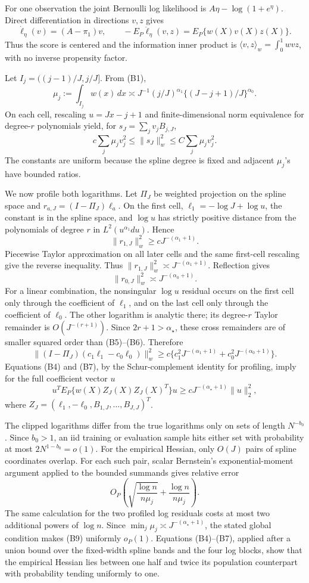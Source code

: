 For one observation the joint Bernoulli log likelihood is \(A\eta-\log(1+e^\eta)\).  Direct differentiation in directions \(v,z\) gives
\[
 \dot\ell_\eta(v)=(A-\pi_1)v,
 \qquad
 -E_P\ddot\ell_\eta(v,z)=E_P\{w(X)v(X)z(X)\}.
\tag{B2}
\]
Thus the score is centered and the information inner product is \(\langle v,z\rangle_w=\int_0^1wvz\), with no inverse propensity factor.

Let \(I_j=((j-1)/J,j/J]\).  From (B1),
\[
 \mu_j:=\int_{I_j}w(x)\,dx
 \asymp J^{-1}(j/J)^{\alpha_1}\{(J-j+1)/J\}^{\alpha_0}.
\tag{B3}
\]
On each cell, rescaling \(u=Jx-j+1\) and finite-dimensional norm equivalence for degree-\(r\) polynomials yield, for \(s_J=\sum_jv_jB_{j,J}\),
\[
 c\sum_j\mu_jv_j^2\le\|s_J\|_w^2\le C\sum_j\mu_jv_j^2.
\tag{B4}
\]
The constants are uniform because the spline degree is fixed and adjacent \(\mu_j\)'s have bounded ratios.

We now profile both logarithms.  Let \(\Pi_J\) be weighted projection on the spline space and \(r_{a,J}=(I-\Pi_J)\ell_a\).  On the first cell, \(\ell_1=-\log J+\log u\), the constant is in the spline space, and \(\log u\) has strictly positive distance from the polynomials of degree \(r\) in \(L^2(u^{\alpha_1}du)\).  Hence
\[
 \|r_{1,J}\|_w^2\ge cJ^{-(\alpha_1+1)}.
\tag{B5}
\]
Piecewise Taylor approximation on all later cells and the same first-cell rescaling give the reverse inequality.  Thus \(\|r_{1,J}\|_w^2\asymp J^{-(\alpha_1+1)}\).  Reflection gives
\[
 \|r_{0,J}\|_w^2\asymp J^{-(\alpha_0+1)}.
\tag{B6}
\]
For a linear combination, the nonsingular \(\log u\) residual occurs on the first cell only through the coefficient of \(\ell_1\), and on the last cell only through the coefficient of \(\ell_0\).  The other logarithm is analytic there; its degree-\(r\) Taylor remainder is \(O(J^{-(r+1)})\).  Since \(2r+1>\alpha_\star\), these cross remainders are of smaller squared order than (B5)--(B6).  Therefore
\[
 \|(I-\Pi_J)(c_1\ell_1-c_0\ell_0)\|_w^2
 \ge c\{c_1^2J^{-(\alpha_1+1)}+c_0^2J^{-(\alpha_0+1)}\}.
\tag{B7}
\]
Equations (B4) and (B7), by the Schur-complement identity for profiling, imply for the full coefficient vector \(u\)
\[
 u^TE_P\{w(X)Z_J(X)Z_J(X)^T\}u
 \ge cJ^{-(\alpha_\star+1)}\|u\|_2^2,
\tag{B8}
\]
where \(Z_J=(\ell_1,-\ell_0,B_{1,J},\ldots,B_{J,J})^T\).

The clipped logarithms differ from the true logarithms only on sets of length \(N^{-b_0}\).  Since \(b_0>1\), an iid training or evaluation sample hits either set with probability at most \(2N^{1-b_0}=o(1)\).  For the empirical Hessian, only \(O(J)\) pairs of spline coordinates overlap.  For each such pair, scalar Bernstein's exponential-moment argument applied to the bounded summands gives relative error
\[
 O_P\!\left(\sqrt{\frac{\log n}{n\mu_j}}+\frac{\log n}{n\mu_j}\right).
\tag{B9}
\]
The same calculation for the two profiled log residuals costs at most two additional powers of \(\log n\).  Since \(\min_j\mu_j\asymp J^{-(\alpha_\star+1)}\), the stated global condition makes (B9) uniformly \(o_P(1)\).  Equations (B4)--(B7), applied after a union bound over the fixed-width spline bands and the four log blocks, show that the empirical Hessian lies between one half and twice its population counterpart with probability tending uniformly to one.

